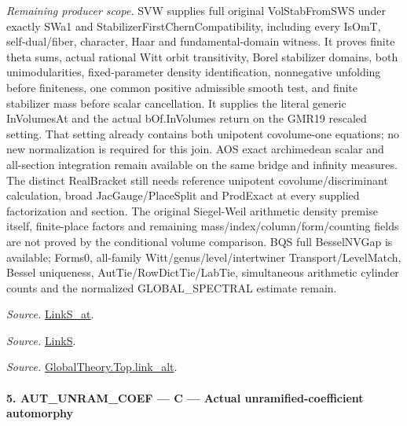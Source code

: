 \documentclass[11pt,a4paper]{article}
\numberwithin{equation}{section}
\theoremstyle{remark}\newtheorem{remark}[theorem]{Remark}
\begin{document}
\emph{Remaining producer scope.} SVW supplies full original VolStabFromSWS under exactly SWa1 and StabilizerFirstChernCompatibility, including every IsOmT, self-dual/fiber, character, Haar and fundamental-domain witness. It proves finite theta sums, actual rational Witt orbit transitivity, Borel stabilizer domains, both unimodularities, fixed-parameter density identification, nonnegative unfolding before finiteness, one common positive admissible smooth test, and finite stabilizer mass before scalar cancellation. It supplies the literal generic InVolumesAt and the actual bOf.InVolumes return on the GMR19 rescaled setting. That setting already contains both unipotent covolume-one equations; no new normalization is required for this join. AOS exact archimedean scalar and all-section integration remain available on the same bridge and infinity measures. The distinct RealBracket still needs reference unipotent covolume/discriminant calculation, broad JacGauge/PlaceSplit and ProdExact at every supplied factorization and section. The original Siegel-Weil arithmetic density premise itself, finite-place factors and remaining mass/index/column/form/counting fields are not proved by the conditional volume comparison. BQS full BesselNVGap is available; Forms0, all-family Witt/genus/level/intertwiner Transport/LevelMatch, Bessel uniqueness, AutTie/RowDictTie/LabTie, simultaneous arithmetic cylinder counts and the normalized GLOBAL\_\allowbreak SPECTRAL estimate remain.

\emph{Source.} \href{https://github.com/CocoSgt/riemann-hypothesis-lean/blob/7cbf7a0c32fca1badf05931879a37c3f8a2b03b4/src/Formalism/SharpRestriction/GlobalTheoremInputs.lean#L145-L149}{LinkS\_\allowbreak at}.

\emph{Source.} \href{https://github.com/CocoSgt/riemann-hypothesis-lean/blob/7cbf7a0c32fca1badf05931879a37c3f8a2b03b4/src/Formalism/SharpRestriction/GlobalTheoremInputs.lean#L152-L157}{LinkS}.

\emph{Source.} \href{https://github.com/CocoSgt/riemann-hypothesis-lean/blob/7cbf7a0c32fca1badf05931879a37c3f8a2b03b4/src/Development/AbelianVarietyTheory/Proofs/GlobalInterpolation/LinkAlt.lean#L16-L50}{GlobalTheory.Top.link\_\allowbreak alt}.



\paragraph{5. AUT\_\allowbreak UNRAM\_\allowbreak COEF — C — Actual unramified-coefficient automorphy}
\end{document}
